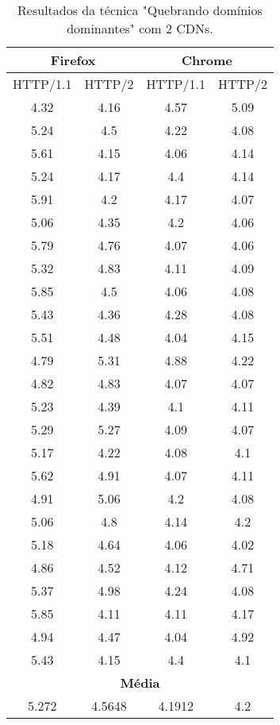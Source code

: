 \begin{table}[H]
	\centering
	\caption{Resultados da técnica "Quebrando domínios dominantes" com 2 CDNs.}
	\label{resultados-quebrandodominiosdominantes-2}
	\begin{tabular}{cccc}
		\hline
		\multicolumn{2}{c}{\textbf{Firefox}} & \multicolumn{2}{c}{\textbf{Chrome}} \\
		\hline
		HTTP/1.1 & HTTP/2 & HTTP/1.1 & HTTP/2 \\
		\hline
		4.32 & 4.16 & 4.57 & 5.09 \\
		5.24 & 4.5 & 4.22 & 4.08 \\
		5.61 & 4.15 & 4.06 & 4.14 \\
		5.24 & 4.17 & 4.4 & 4.14 \\
		5.91 & 4.2 & 4.17 & 4.07 \\
		5.06 & 4.35 & 4.2 & 4.06 \\
		5.79 & 4.76 & 4.07 & 4.06 \\
		5.32 & 4.83 & 4.11 & 4.09 \\
		5.85 & 4.5 & 4.06 & 4.08 \\
		5.43 & 4.36 & 4.28 & 4.08 \\
		5.51 & 4.48 & 4.04 & 4.15 \\
		4.79 & 5.31 & 4.88 & 4.22 \\
		4.82 & 4.83 & 4.07 & 4.07 \\
		5.23 & 4.39 & 4.1 & 4.11 \\
		5.29 & 5.27 & 4.09 & 4.07 \\
		5.17 & 4.22 & 4.08 & 4.1 \\
		5.62 & 4.91 & 4.07 & 4.11 \\
		4.91 & 5.06 & 4.2 & 4.08 \\
		5.06 & 4.8 & 4.14 & 4.2 \\
		5.18 & 4.64 & 4.06 & 4.02 \\
		4.86 & 4.52 & 4.12 & 4.71 \\
		5.37 & 4.98 & 4.24 & 4.08 \\
		5.85 & 4.11 & 4.11 & 4.17 \\
		4.94 & 4.47 & 4.04 & 4.92 \\
		5.43 & 4.15 & 4.4 & 4.1 \\
		\hline
		\multicolumn{4}{c}{\textbf{Média}} \\
		5.272 & 4.5648 & 4.1912 & 4.2 \\
		\hline
	\end{tabular}
\end{table}